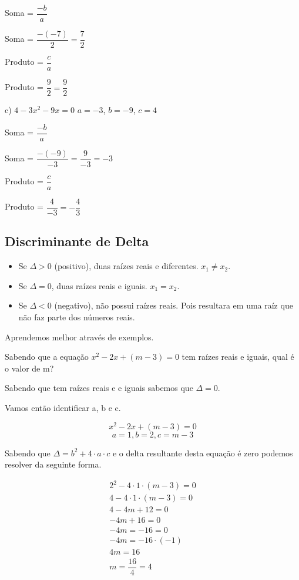 \documentclass[letterpaper]{book}
\begin{document}
Soma = \(\dfrac{-b}{a}\)

Soma = \(\dfrac{-(-7)}{2} = \dfrac{7}{2}\)

Produto = \(\dfrac{c}{a}\)

Produto = \(\dfrac{9}{2} = \dfrac{9}{2}\)

c) \(4 - 3x^{2} - 9x = 0\)
\(a = -3\), $b = -9$, $c = 4$

Soma = \(\dfrac{-b}{a}\)

Soma = \(\dfrac{-(-9)}{-3} = \dfrac{9}{-3} = -3\)

Produto = \(\dfrac{c}{a}\)

Produto = \(\dfrac{4}{-3} = - \dfrac{4}{3}\)


\subsection{Discriminante de Delta}

\begin{itemize}
\item Se \(\Delta > 0\) (positivo), duas raízes reais e diferentes. $x_1 \neq x_2$.
\item Se \(\Delta = 0\), duas raízes reais e iguais. $x_1 = x_2$.
\item Se \(\Delta < 0\) (negativo), não possui raízes reais. Pois resultara em uma raíz que não faz parte dos números reais.
\end{itemize}

Aprendemos melhor através de exemplos.

Sabendo que a equação \(x^{2} - 2x + (m-3) = 0\) tem raízes reais e iguais, qual é o valor de m?

Sabendo que tem raízes reais e e iguais sabemos que \(\Delta = 0\).


Vamos então identificar a, b e c.


\[x^{2} - 2x + (m-3) = 0\]
\[a = 1, b = 2, c = m - 3\]


Sabendo que \(\Delta = b^{2} + 4 \cdot a \cdot c\) e o delta resultante desta equação é zero podemos resolver da seguinte forma.

\begin{align}
2^{2} - 4 \cdot 1 \cdot (m-3) = 0 \\
4 - 4 \cdot 1 \cdot (m-3) = 0 \\
4 - 4m + 12= 0 \\
-4m + 16 = 0 \\
-4m = -16 = 0 \\
-4m = -16 \cdot (-1) \\
4m = 16 \\
m = \dfrac{16}{4} = 4
\end{align}
\end{document}
